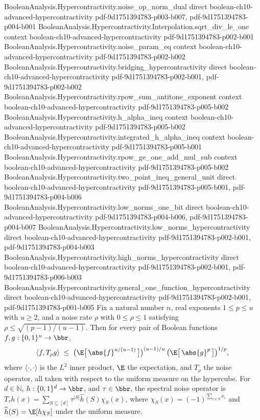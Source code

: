 \begin{theorem}
  {BooleanAnalysis.Hypercontractivity.noise_op_norm_dual}
  {direct}
  {boolean-ch10-advanced-hypercontractivity}
  {pdf-9d1751394783-p003-b007,
    pdf-9d1751394783-p004-b001}
\proofstep
  {BooleanAnalysis.Hypercontractivity.Interpolation.sqrt_div_le_one}
  {context}
  {boolean-ch10-advanced-hypercontractivity}
  {pdf-9d1751394783-p002-b001}
\proofstep
  {BooleanAnalysis.Hypercontractivity.noise_param_eq}
  {context}
  {boolean-ch10-advanced-hypercontractivity}
  {pdf-9d1751394783-p002-b002}
\proofstep
  {BooleanAnalysis.Hypercontractivity.bridging_hypercontractivity}
  {direct}
  {boolean-ch10-advanced-hypercontractivity}
  {pdf-9d1751394783-p002-b001,
    pdf-9d1751394783-p002-b002}
\proofstep
  {BooleanAnalysis.Hypercontractivity.rpow_sum_antitone_exponent}
  {context}
  {boolean-ch10-advanced-hypercontractivity}
  {pdf-9d1751394783-p005-b002}
\proofstep
  {BooleanAnalysis.Hypercontractivity.h_alpha_ineq}
  {context}
  {boolean-ch10-advanced-hypercontractivity}
  {pdf-9d1751394783-p005-b002}
\proofstep
  {BooleanAnalysis.Hypercontractivity.integrated_h_alpha_ineq}
  {context}
  {boolean-ch10-advanced-hypercontractivity}
  {pdf-9d1751394783-p005-b001}
\proofstep
  {BooleanAnalysis.Hypercontractivity.rpow_ge_one_add_mul_sub}
  {context}
  {boolean-ch10-advanced-hypercontractivity}
  {pdf-9d1751394783-p005-b002}
\proofstep
  {BooleanAnalysis.Hypercontractivity.two_point_ineq_general_unit}
  {direct}
  {boolean-ch10-advanced-hypercontractivity}
  {pdf-9d1751394783-p005-b001,
    pdf-9d1751394783-p004-b006}
\proofstep
  {BooleanAnalysis.Hypercontractivity.low_norms_one_bit}
  {direct}
  {boolean-ch10-advanced-hypercontractivity}
  {pdf-9d1751394783-p004-b006,
    pdf-9d1751394783-p004-b007}
\proofstep
  {BooleanAnalysis.Hypercontractivity.low_norms_hypercontractivity}
  {direct}
  {boolean-ch10-advanced-hypercontractivity}
  {pdf-9d1751394783-p002-b001,
    pdf-9d1751394783-p004-b003}
\proofstep
  {BooleanAnalysis.Hypercontractivity.high_norms_hypercontractivity}
  {direct}
  {boolean-ch10-advanced-hypercontractivity}
  {pdf-9d1751394783-p002-b001,
    pdf-9d1751394783-p006-b003}
\proofstep
  {BooleanAnalysis.Hypercontractivity.general_one_function_hypercontractivity}
  {direct}
  {boolean-ch10-advanced-hypercontractivity}
  {pdf-9d1751394783-p002-b001,
    pdf-9d1751394783-p001-b005}
Fix a natural number $n$, real exponents $1 \le p \le u$ with $u \ge 2$, and a noise
rate $\rho$ with $0 \le
\rho \le 1$ satisfying $\rho \le \sqrt{(p-1)/(u-1)}$. Then for every pair of Boolean
functions $f, g : \{0,1\}^n \to \bbr$,
\[
  \langle f, T_\rho g\rangle
  \;\le\;
  \bigl(\E\bigl[\,\abs{f}^{u/(u-1)}\,\bigr]\bigr)^{(u-1)/u}\,
  \bigl(\E\bigl[\,\abs{g}^{p}\,\bigr]\bigr)^{1/p},
\]
where $\langle\cdot,\cdot\rangle$ is the $L^2$ inner product, $\E$ the expectation, and
$T_\rho$ the noise operator, all taken with respect to the uniform measure on the
hypercube. For $d\in\mathbb N$, $h:\{0,1\}^d\to\bbr$, and $\tau\in\bbr$, the spectral
noise operator is $T_\tau h(x)=\sum_{S\subseteq[d]}\tau^{|S|}\widehat h(S)\chi_S(x)$,
where $\chi_S(x)=(-1)^{\sum_{i\in S}x_i}$ and $\widehat h(S)=\E[h\chi_S]$ under the
uniform measure.
\end{theorem}
